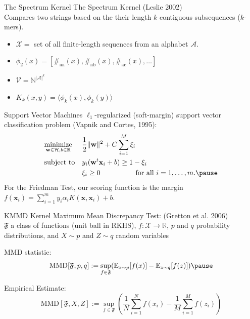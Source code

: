 \documentclass{beamer}
\providecommand{\norm}[1]{\lVert#1\rVert}
\begin{document}
\begin{frame}{The Spectrum Kernel}
  The Spectrum Kernel (Leslie 2002) \\ \pause
  Compares two strings based on the their length $k$ contiguous
  subsequences ($k$-mers). \pause
  \begin{itemize}
    \item $\mathcal{X} = $ set of all finite-length sequences from an alphabet $\mathcal{A}$. \pause
    \item $\phi_2(x) = [\#_{\text{aa}}(x), \#_{\text{ab}}(x), \#_{\text{ac}}(x), \ldots ]$ \pause
    \item $\mathcal{V} = \mathbb{N}^{|\mathcal{A}|^k}$ \pause
    \item $K_k(x,y) = \langle \phi_k(x), \phi_k(y) \rangle$
  \end{itemize}
\end{frame}

\begin{frame}{Support Vector Machines}
$\ell_1$-regularized (soft-margin) support vector classification problem
(Vapnik and Cortes, 1995): \pause
\begin{equation*}
\begin{aligned}
& \underset{\mathbf{w} \in \mathcal{H}, b \in \mathbb{R}}{\text{minimize}}
& &\frac{1}{2}\norm{\mathbf{w}}^2+C\sum_{i=1}^M \xi_i \\
& \text{subject to}
& & y_i(\mathbf{w}^t \mathbf{x}_i + b) \geq 1 - \xi_i \\
&&& \xi_i \geq 0 \qquad \qquad \quad \text{for all } i=1,\ldots,m. \pause
\end{aligned}
\end{equation*}
For the Friedman Test, our scoring function is the margin
$f(\mathbf{x}_i) = \sum_{i=1}^m y_i \alpha_i K(\mathbf{x}, \mathbf{x}_i) + b$.
\end{frame}

\begin{frame}{KMMD}
  Kernel Maximum Mean Discrepancy Test: (Gretton et al. 2006) \\ \pause
  $\mathfrak{F}$ a class of functions (unit ball in RKHS), $f:\mathcal{X} \to \mathbb{R}$,
  $p$ and $q$ probability distributions, and $X \sim p$ and $Z \sim q$ random variables \\ \pause

  MMD statistic:
  \begin{equation*}
    \text{MMD}[\mathfrak{F},p,q] := \sup_{f\in
      \mathfrak{F}}(\mathbb{E}_{x\sim p}[f(x)] - \mathbb{E}_{z\sim q}[f(z)]) \pause
  \end{equation*}

  Empirical Estimate:
  \begin{equation*}
    \text{MMD}[\mathfrak{F},X,Z] := \sup_{f\in
      \mathfrak{F}}\left (\frac{1}{N}\sum_{i=1}^Nf(x_i) -
    \frac{1}{M}\sum_{i=1}^M f(z_i) \right )
  \end{equation*}
\end{frame}
\end{document}
